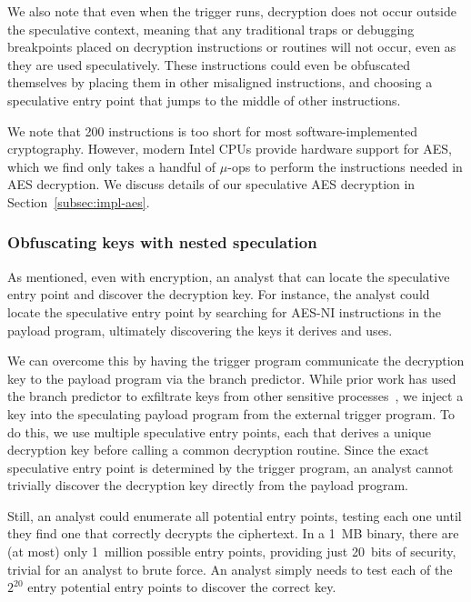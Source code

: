 We also note that even when the trigger runs, decryption does not occur outside
the speculative context, meaning that any traditional traps or debugging
breakpoints placed on decryption instructions or routines will not occur, even
as they are used speculatively. These instructions could even be obfuscated themselves by
placing them in other misaligned instructions, and choosing a speculative entry
point that jumps to the middle of other instructions.


We note that 200 instructions is too short for most software-implemented
cryptography. However, modern Intel CPUs provide hardware support for AES, which
we find only takes a handful of $\mu$-ops to perform the instructions needed in
AES decryption. We discuss details of our speculative AES decryption in
Section~\ref{subsec:impl-aes}.


\subsubsection{Obfuscating keys with nested speculation}
\label{subsec:nested-spec}

As mentioned, even with encryption, an analyst that can locate the
speculative entry point and discover the decryption key. For instance, the
analyst could locate the speculative entry point by searching for AES-NI
instructions in the payload program, ultimately discovering the keys it derives
and uses.

We can overcome this by having the trigger program communicate the decryption
key to the payload program via the branch predictor. While prior work has used
the branch predictor to exfiltrate keys from other sensitive
processes~\cite{aciiccmez2007predicting}, we inject a key into the speculating payload program
from the external trigger program. To do this, we use
multiple speculative entry points, each that derives a unique decryption key
before calling a common decryption
routine. Since the exact speculative entry point is determined by the trigger
program, an analyst cannot trivially discover the decryption key directly from the payload
program. 

Still, an analyst could enumerate all potential entry points, testing each one
until they find one that correctly decrypts the ciphertext. In a 1~MB binary,
there are (at most) only 1~million possible entry points, providing just 20~bits of
security, trivial for an analyst to brute force. An analyst simply needs to test
each of the $2^{20}$ entry potential entry points to discover the correct key.

